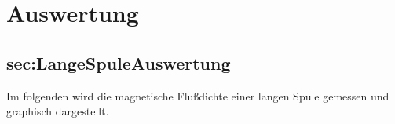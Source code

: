 \section{Auswertung}
\label{sec:Auswertung}

\subsection{sec:LangeSpuleAuswertung}

Im folgenden wird die magnetische Flußdichte einer langen Spule gemessen und graphisch dargestellt.
